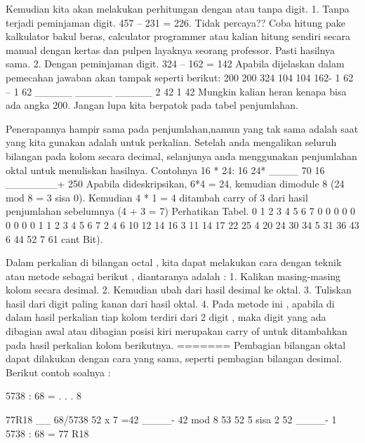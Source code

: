 Kemudian kita akan melakukan perhitungan dengan atau tanpa digit.  
1.	Tanpa terjadi peminjaman digit.
457 – 231 = 226. Tidak percaya?? Coba hitung pake kalkulator bakul beras, calculator programmer atau kalian hitung sendiri secara manual dengan kertas dan pulpen layaknya seorang professor. Pasti hasilnya sama.
2.	Dengan peminjaman digit.
324 – 162 = 142
Apabila dijelaskan dalam pemecahan jawaban akan tampak seperti berikut:
                                200                                         200
324                           104                                          104
162-                       1  62 –                                    1   62
_____                   _____                                   _____
    2                              42                                       1   42
Mungkin kalian heran kenapa bisa ada angka 200. Jangan lupa kita berpatok pada tabel penjumlahan.
	
Penerapannya hampir sama pada penjumlahan,namun yang tak sama adalah saat yang kita gunakan adalah untuk perkalian. Setelah anda mengalikan seluruh bilangan pada kolom secara decimal, selanjunya anda menggunakan penjumlahan oktal untuk menuliskan hasilnya.
Contohnya 16 * 24:
16
24*
____
                70
             16
            _______+
            250
Apabila dideskripsikan, 6*4 = 24, kemudian dimodule 8 (24 mod 8 = 3 sisa 0). Kemudian 4 * 1 = 4 ditambah carry of 3 dari hasil penjumlahan sebelumnya (4 + 3 = 7)
Perhatikan Tabel.
0	1	2	3	4	5	6	7
0	0	0	0	0	0	0	0	0
1	1	2	3	4	5	6	7
2	4	6	10	12	14	16
3	11	14	17	22	25
4	20	24	30	34
5	31	36	43
6	44	52
7	61
cant Bit).

Dalam perkalian di bilangan octal , kita dapat melakukan cara dengan teknik atau metode sebagai berikut , diantaranya adalah :
1.	Kalikan masing-masing kolom secara desimal.
2.	Kemudian ubah dari hasil desimal ke oktal.
3.	Tuliskan hasil dari digit paling kanan dari hasil oktal.
4.	Pada metode ini , apabila di dalam hasil perkalian tiap kolom terdiri dari 2 digit , maka digit yang ada dibagian awal atau dibagian posisi kiri merupakan carry of untuk ditambahkan pada hasil perkalian kolom berikutnya.
=======
Pembagian bilangan oktal dapat dilakukan dengan cara yang sama, seperti pembagian bilangan desimal.
Berikut contoh soalnya :
	
5738 :  68 = . . . 8	
	 
	   77R18
	   __
	68/5738
	   52		\-\- x 7 =42
	   ____-	42 mod 8
	    53
	    52		\-\-\> \= 5 sisa 2 52
	   ____-
	   	 1
5738 : 68 = 77 R18


